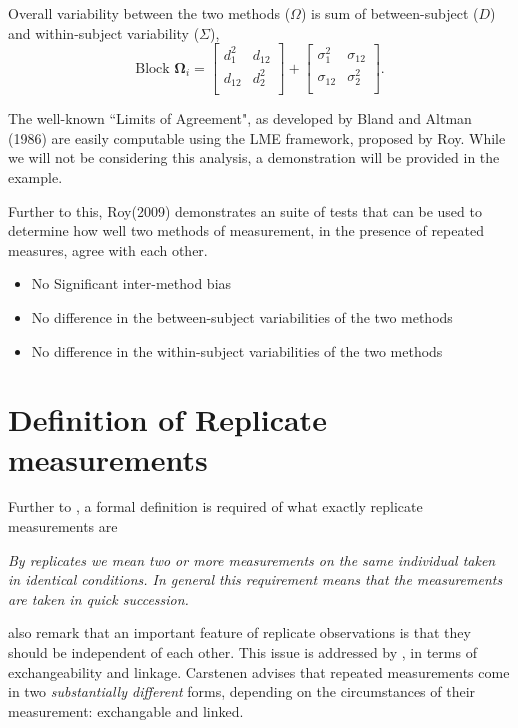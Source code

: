 \documentclass[12pt, a4paper]{report}
\theoremstyle{plain}
\theoremstyle{definition}
\theoremstyle{remark}
\begin{document}
	Overall variability between the two methods ($\Omega$) is sum of between-subject ($D$) and within-subject variability ($\Sigma$),
	\[
	\mbox{Block } \boldsymbol{\Omega}_i = \left[ \begin{array}{cc} d^2_1 & d_{12}\\ d_{12} & d^2_2\\ \end{array} \right]
	+ \left[\begin{array}{cc} \sigma^2_1 & \sigma_{12}\\ \sigma_{12} & \sigma^2_2\\ \end{array}\right].
	\]
	
	The well-known ``Limits of Agreement", as developed by Bland and Altman (1986) are easily computable using the LME framework, proposed by Roy. While we will not be considering this analysis, a demonstration will be provided in the example.
	
	Further to this, Roy(2009) demonstrates an suite of tests that can be used to determine how well two methods of measurement, in the presence of repeated measures, agree with each other.
	
	\begin{itemize}\itemsep0.5cm
		\item No Significant inter-method bias
		\item No difference in the between-subject variabilities of the two methods
		\item No difference in the within-subject variabilities of the two methods
	\end{itemize}
	
	\section{Definition of Replicate measurements}
	Further to \citet{BA99}, a formal definition is required of what exactly replicate measurements are
	
	\emph{By replicates we mean two or more measurements on the same
		individual taken in identical conditions. In general this requirement means that the
		measurements are taken in quick succession.}
	
	\citet{BA99} also remark that an important feature of replicate observations is that they should be independent
	of each other. This issue is addressed by \citet{BXC2010}, in terms of exchangeability and linkage. Carstenen advises that repeated measurements come in two \emph{substantially different} forms, depending on the circumstances of their measurement: exchangable and linked.
\end{document}
